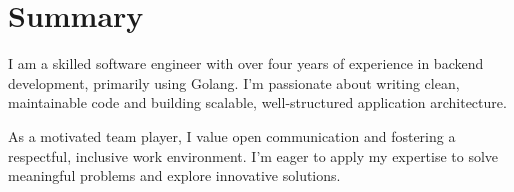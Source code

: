 \section{Summary}
I am a skilled software engineer with over four years of experience in backend development, 
primarily using Golang. I’m passionate about writing clean, maintainable code 
and building scalable, well-structured application architecture.  


\vspace{0.4em}
As a motivated team player, I value open communication and fostering a respectful, 
inclusive work environment. I’m eager to apply my expertise to solve 
meaningful problems and explore innovative solutions.  



